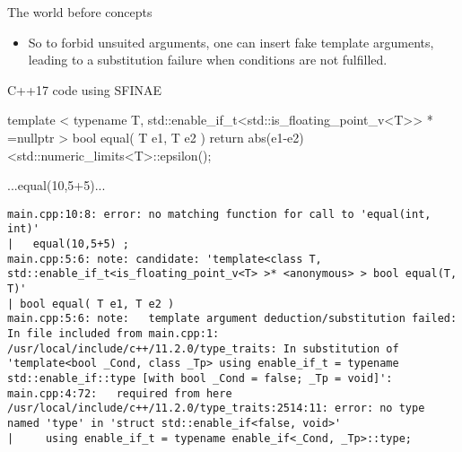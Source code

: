 \begin{frame}[fragile]
  \begin{block}{The world before concepts}
    \begin{itemize}
    \item So to forbid unsuited arguments, one can insert fake template arguments,
    leading to a substitution failure when conditions are not fulfilled.
    \end{itemize}
  \end{block}
  \begin{exampleblock}{C++17 code using SFINAE}
    \scriptsize
    \begin{cppcode*}{}
    template
    < typename T, std::enable_if_t<std::is_floating_point_v<T>> * =nullptr >
    bool equal( T e1, T e2 )
    { return abs(e1-e2)<std::numeric_limits<T>::epsilon(); }

    ...equal(10,5+5)...
    \end{cppcode*}
    \tiny
    \begin{verbatim}
main.cpp:10:8: error: no matching function for call to 'equal(int, int)'
|   equal(10,5+5) ;
main.cpp:5:6: note: candidate: 'template<class T, std::enable_if_t<is_floating_point_v<T> >* <anonymous> > bool equal(T, T)'
| bool equal( T e1, T e2 )
main.cpp:5:6: note:   template argument deduction/substitution failed:
In file included from main.cpp:1:
/usr/local/include/c++/11.2.0/type_traits: In substitution of 'template<bool _Cond, class _Tp> using enable_if_t = typename std::enable_if::type [with bool _Cond = false; _Tp = void]':
main.cpp:4:72:   required from here
/usr/local/include/c++/11.2.0/type_traits:2514:11: error: no type named 'type' in 'struct std::enable_if<false, void>'
|     using enable_if_t = typename enable_if<_Cond, _Tp>::type;
    \end{verbatim}
  \end{exampleblock}
\end{frame}

